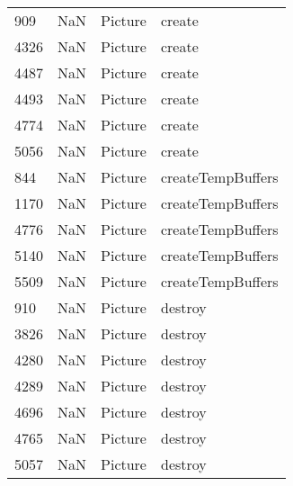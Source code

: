 \begin{tabular}{llll}
909  &                   NaN &                    Picture &                                    create \\
4326 &                   NaN &                    Picture &                                    create \\
4487 &                   NaN &                    Picture &                                    create \\
4493 &                   NaN &                    Picture &                                    create \\
4774 &                   NaN &                    Picture &                                    create \\
5056 &                   NaN &                    Picture &                                    create \\
844  &                   NaN &                    Picture &                         createTempBuffers \\
1170 &                   NaN &                    Picture &                         createTempBuffers \\
4776 &                   NaN &                    Picture &                         createTempBuffers \\
5140 &                   NaN &                    Picture &                         createTempBuffers \\
5509 &                   NaN &                    Picture &                         createTempBuffers \\
910  &                   NaN &                    Picture &                                   destroy \\
3826 &                   NaN &                    Picture &                                   destroy \\
4280 &                   NaN &                    Picture &                                   destroy \\
4289 &                   NaN &                    Picture &                                   destroy \\
4696 &                   NaN &                    Picture &                                   destroy \\
4765 &                   NaN &                    Picture &                                   destroy \\
5057 &                   NaN &                    Picture &                                   destroy \\

\end{tabular}
